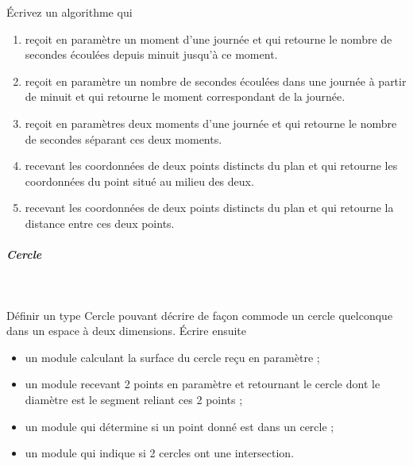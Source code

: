 \documentclass[11pt,a4paper]{article}
\begin{document}
            \par
        
        \'Ecrivez un algorithme qui 
          
					\begin{enumerate}
				
			\item re\c coit en param\`etre un moment d'une journ\'ee et qui retourne le nombre de secondes \'ecoul\'ees depuis minuit jusqu'\`a ce moment.
			\item 
              re\c coit en param\`etre un nombre de secondes \'ecoul\'ees dans une journ\'ee 
              \`a partir de minuit et qui retourne le moment correspondant de la journ\'ee.
			\item re\c coit en param\`etres deux moments d'une journ\'ee et qui retourne le
              nombre de secondes s\'eparant ces deux moments.
			\item recevant les coordonn\'ees de deux points distincts du plan et qui retourne
              les coordonn\'ees du point situ\'e au milieu des deux.
			\item recevant les coordonn\'ees de deux points distincts du plan et qui retourne
              la distance entre ces deux points.
					\end{enumerate}
				
            \par
        
			
		\subparagraph{Cercle} 
		
					\textcolor{white}{.} \par
				
          D\'efinir un type Cercle pouvant d\'ecrire de fa\c con commode un cercle quelconque dans un
          espace \`a deux dimensions. \'Ecrire ensuite
          
					\begin{itemize}
				
			\item un module calculant la surface du cercle re\c cu en param\`etre ;
			\item un module recevant 2 points en param\`etre et retournant le cercle dont le diam\`etre est le segment reliant ces 2 points ;
			\item un module qui d\'etermine si un point donn\'e est dans un cercle ;
			\item un module qui indique si 2 cercles ont une intersection.
					\end{itemize}
				
            \par
        
				
\end{document}
